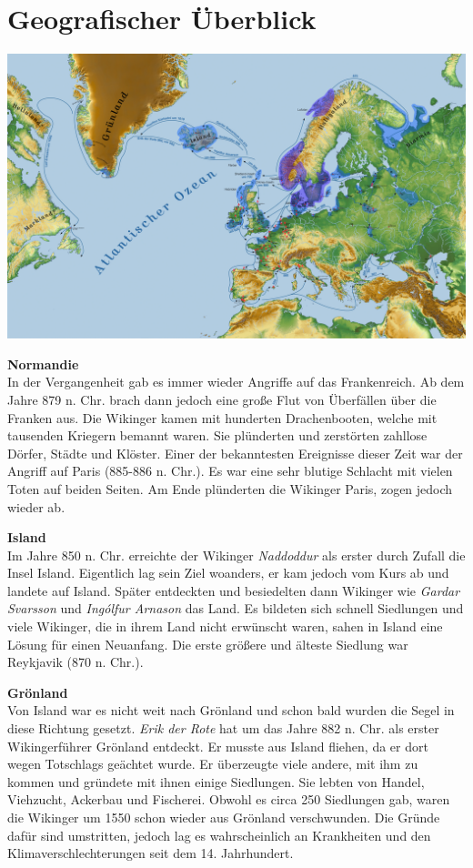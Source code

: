 \documentclass[12pt,a4paper,ngerman,openany]{book}
\begin{document}
\section{Geografischer Überblick}
\begin{center}
  \hspace*{-2.35cm}
  \includegraphics[width=0.9\paperwidth]{siedlungspunkte.png}
\end{center}

\textbf{Normandie}\\
In der Vergangenheit gab es immer wieder Angriffe auf das Frankenreich. Ab dem Jahre 879 n. Chr. brach dann jedoch eine große Flut von Überfällen über die Franken aus. Die Wikinger kamen mit hunderten Drachenbooten, welche mit tausenden Kriegern bemannt waren. Sie plünderten und zerstörten zahllose Dörfer, Städte und Klöster. Einer der bekanntesten Ereignisse dieser Zeit war der Angriff auf Paris (885-886 n. Chr.). Es war eine sehr blutige Schlacht mit vielen Toten auf beiden Seiten.
Am Ende plünderten die Wikinger Paris, zogen jedoch wieder ab.

\textbf{Island}\\
Im Jahre 850 n. Chr. erreichte der Wikinger \textit{Naddoddur} als erster durch Zufall die Insel Island. Eigentlich lag sein Ziel woanders, er kam jedoch vom Kurs ab und landete auf Island. Später entdeckten und besiedelten dann Wikinger wie \textit{Gardar Svarsson} und \textit{Ingólfur Arnason} das Land. Es bildeten sich schnell Siedlungen und viele Wikinger, die in ihrem Land nicht erwünscht waren, sahen in Island eine Lösung für einen Neuanfang. Die erste größere und älteste Siedlung war Reykjavik (870 n. Chr.). 

\textbf{Grönland}\\
Von Island war es nicht weit nach Grönland und schon bald wurden die Segel in diese Richtung gesetzt. \textit{Erik der Rote} hat um das Jahre 882 n. Chr. als erster Wikingerführer Grönland entdeckt. Er musste aus Island fliehen, da er dort wegen Totschlags geächtet wurde. Er überzeugte viele andere, mit ihm zu kommen und gründete mit ihnen einige Siedlungen. Sie lebten von Handel, Viehzucht, Ackerbau und Fischerei. Obwohl es circa 250 Siedlungen gab, waren die Wikinger um 1550 schon wieder aus Grönland verschwunden. Die Gründe dafür sind umstritten, jedoch lag es wahrscheinlich an Krankheiten und den Klimaverschlechterungen seit dem 14. Jahrhundert.
\end{document}
